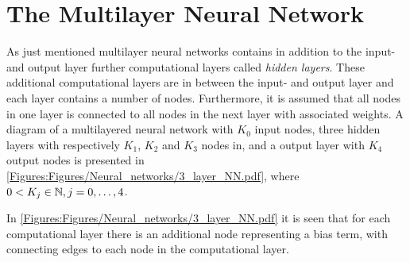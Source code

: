\section{The Multilayer Neural Network}
As just mentioned multilayer neural networks contains in addition to the input- and output layer further computational layers called \emph{hidden layers}. These additional computational layers are in between the input- and output layer and each layer contains a number of nodes. Furthermore, it is assumed that all nodes in one layer is connected to all nodes in the next layer with associated weights. A diagram of a multilayered neural network with $K_0$ input nodes, three hidden layers with respectively $K_1$, $K_2$ and $K_3$ nodes in, and a output layer with $K_4$ output nodes is presented in \autoref{Figures:Figures/Neural_networks/3_layer_NN.pdf}, where $0<K_j \in \mathbb{N}, j = 0,\ldots, 4$.

In \autoref{Figures:Figures/Neural_networks/3_layer_NN.pdf} it is seen that for each computational layer there is an additional node representing a bias term, with connecting edges to each node in the computational layer.

